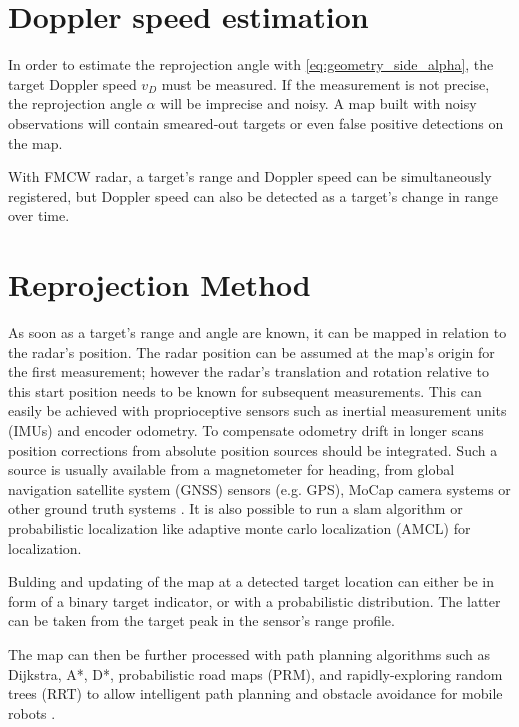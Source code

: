 \section{Doppler speed estimation}\label{doppler-speed-estimation}

In order to estimate the reprojection angle with \cref{eq:geometry_side_alpha}, the target Doppler speed $v_D$ must be measured. If the measurement is not precise, the reprojection angle \(\alpha\) will be imprecise and noisy. A map built with noisy observations will contain smeared-out targets or even false positive detections on the map.

With FMCW radar, a target's range and Doppler speed can be simultaneously registered, but Doppler speed can also be detected as a target's change in range over time.

\section{Reprojection Method}\label{reprojection-method}

As soon as a target's range and angle are known, it can be mapped in relation
to the radar's position. The radar position can be assumed at the map's origin for the first measurement; however the radar's translation and rotation relative to this start position needs to be known for subsequent measurements. This can easily be achieved with proprioceptive sensors such as inertial measurement units (IMUs) and encoder odometry. To compensate odometry drift in longer scans position corrections from absolute position sources should be integrated. Such a source is usually available from a magnetometer for heading, from global navigation satellite system (GNSS) sensors (e.g. GPS), MoCap camera systems or other ground truth systems \cite{Godil2013}. It is also possible to run a slam algorithm or probabilistic localization like adaptive monte carlo localization (AMCL) for localization.

Bulding and updating of the map at a detected target location can either be in form of a binary target indicator, or with a probabilistic distribution. The latter can be taken from the target peak in the sensor's range profile.

The map can then be further processed with path planning algorithms such as Dijkstra, A*, D*, probabilistic road maps (PRM), and rapidly-exploring random trees (RRT) to allow intelligent path planning and obstacle avoidance for mobile robots \cite{Correll2016}.

